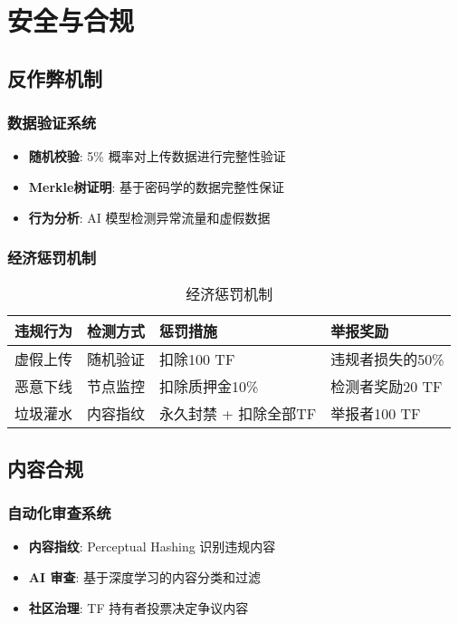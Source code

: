\documentclass[12pt,a4paper]{article}
\begin{document}
\section{安全与合规}

\subsection{反作弊机制}

\subsubsection{数据验证系统}
\begin{itemize}
    \item \textbf{随机校验}: 5\% 概率对上传数据进行完整性验证
    \item \textbf{Merkle树证明}: 基于密码学的数据完整性保证
    \item \textbf{行为分析}: AI 模型检测异常流量和虚假数据
\end{itemize}

\subsubsection{经济惩罚机制}

\begin{table}[h]
\centering
\begin{tabular}{|l|l|l|l|}
\hline
\textbf{违规行为} & \textbf{检测方式} & \textbf{惩罚措施} & \textbf{举报奖励} \\
\hline
虚假上传 & 随机验证 & 扣除100 TF & 违规者损失的50\% \\
\hline
恶意下线 & 节点监控 & 扣除质押金10\% & 检测者奖励20 TF \\
\hline
垃圾灌水 & 内容指纹 & 永久封禁 + 扣除全部TF & 举报者100 TF \\
\hline
\end{tabular}
\caption{经济惩罚机制}
\end{table}

\subsection{内容合规}

\subsubsection{自动化审查系统}
\begin{itemize}
    \item \textbf{内容指纹}: Perceptual Hashing 识别违规内容
    \item \textbf{AI 审查}: 基于深度学习的内容分类和过滤
    \item \textbf{社区治理}: TF 持有者投票决定争议内容
\end{itemize}
\end{document}
